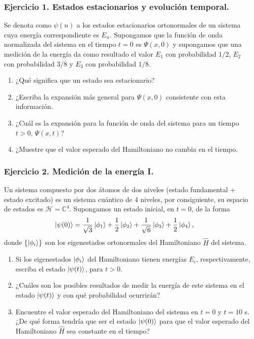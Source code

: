 \documentclass[11pt,letterpaper]{article}
\begin{document}
\subsubsection*{Ejercicio 1. Estados estacionarios y evolución temporal.}
Se denota como $\psi(n)$ a los estados estacionarios 
ortonormales de un sistema cuya energ\'ia correspondiente es $E_n$. 
Supongamos que la funci\'on de onda normalizada
del sistema en el tiempo $t=0$ es $\Psi(x,0)$ y supongamos que una medici\'on
de la energ\'ia da como resultado el valor $E_1$ con probabilidad $1/2$, $E_2$
con probabilidad $3/8$ y $E_3$ con probabilidad $1/8$. 
\begin{enumerate}
\item ¿Qu\'e significa que un estado sea estacionario?
\item ¿Escriba la expansi\'on m\'as general para $\Psi(x,0)$ consistente con 
esta informaci\'on.
\item ¿Cu\'al es la expansi\'on para la funci\'on de onda del sistema para un tiempo 
$t>0$, $\Psi(x,t)$?
\item ¿Muestre que el valor esperado del Hamiltoniano no cambia en el tiempo.
\end{enumerate}

\subsubsection*{Ejercicio 2. Medición de la energía I.}
Un sistema compuesto por dos átomos de dos niveles (estado fundamental + 
estado excitado) es un sistema cuántico de 4 niveles, por consiguiente, su 
espacio de estados es $\mathcal{H}=\mathbb{C}^4$. Supongamos un estado
inicial, en $t=0$, de la forma
\begin{align}
\ket{\psi(0)}&=\frac{1}{\sqrt{3}}\ket{\phi_1}+\frac{1}{2}\ket{\phi_2}
+\frac{1}{\sqrt{6}}\ket{\phi_3}+\frac{1}{2}\ket{\phi_4},
\end{align}
donde $\{ \ket{\phi_i}\}$ son los eigenestados ortonormales del Hamiltoniano
$\hat H$ del sistema. 
\begin{enumerate}
\item Si los eigenestados $\ket{\phi_i}$ del Hamiltoniano tienen
energías $E_i$, respectivamente, escriba el estado
$\ket{\psi(t)}$, para $t>0$.
\item ¿Cuáles son los posibles resultados de medir la energía de este sistema
en el estado $\ket{\psi(t)}$ y con qué probabilidad ocurrirán?
\item Encuentre el valor esperado del Hamiltoniano del sistema en $t=0$
y $t=10$ s. ¿De qué forma tendría que ser el estado $\ket{\psi(0)}$ para que 
el valor esperado del Hamiltoniano $\hat H$ sea constante en el tiempo?
\end{enumerate}
\end{document}
